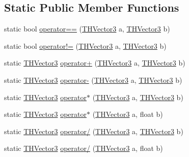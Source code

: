 \subsection*{Static Public Member Functions}
\begin{DoxyCompactItemize}
\item 
static bool \hyperlink{struct_bee_game_1_1_t_h_vector3_a34bd2c518136fe76411bba95f75cebdb}{operator==} (\hyperlink{struct_bee_game_1_1_t_h_vector3}{T\+H\+Vector3} a, \hyperlink{struct_bee_game_1_1_t_h_vector3}{T\+H\+Vector3} b)
\item 
static bool \hyperlink{struct_bee_game_1_1_t_h_vector3_a899f8d05be6344481d7411fee8b933a1}{operator!=} (\hyperlink{struct_bee_game_1_1_t_h_vector3}{T\+H\+Vector3} a, \hyperlink{struct_bee_game_1_1_t_h_vector3}{T\+H\+Vector3} b)
\item 
static \hyperlink{struct_bee_game_1_1_t_h_vector3}{T\+H\+Vector3} \hyperlink{struct_bee_game_1_1_t_h_vector3_a49eda0cb0ef9880dbcc9a60eaede8738}{operator+} (\hyperlink{struct_bee_game_1_1_t_h_vector3}{T\+H\+Vector3} a, \hyperlink{struct_bee_game_1_1_t_h_vector3}{T\+H\+Vector3} b)
\item 
static \hyperlink{struct_bee_game_1_1_t_h_vector3}{T\+H\+Vector3} \hyperlink{struct_bee_game_1_1_t_h_vector3_a036ff2d81d5be5ebbff5fe88555b6c79}{operator-\/} (\hyperlink{struct_bee_game_1_1_t_h_vector3}{T\+H\+Vector3} a, \hyperlink{struct_bee_game_1_1_t_h_vector3}{T\+H\+Vector3} b)
\item 
static \hyperlink{struct_bee_game_1_1_t_h_vector3}{T\+H\+Vector3} \hyperlink{struct_bee_game_1_1_t_h_vector3_a12e036f0743ac6ad26ac3b5c936c2b99}{operator$\ast$} (\hyperlink{struct_bee_game_1_1_t_h_vector3}{T\+H\+Vector3} a, \hyperlink{struct_bee_game_1_1_t_h_vector3}{T\+H\+Vector3} b)
\item 
static \hyperlink{struct_bee_game_1_1_t_h_vector3}{T\+H\+Vector3} \hyperlink{struct_bee_game_1_1_t_h_vector3_a62b6cab97890f7bb66c69c6f60bab04f}{operator$\ast$} (\hyperlink{struct_bee_game_1_1_t_h_vector3}{T\+H\+Vector3} a, float b)
\item 
static \hyperlink{struct_bee_game_1_1_t_h_vector3}{T\+H\+Vector3} \hyperlink{struct_bee_game_1_1_t_h_vector3_a465cd9dbaa1888ead6ea805852847e25}{operator/} (\hyperlink{struct_bee_game_1_1_t_h_vector3}{T\+H\+Vector3} a, \hyperlink{struct_bee_game_1_1_t_h_vector3}{T\+H\+Vector3} b)
\item 
static \hyperlink{struct_bee_game_1_1_t_h_vector3}{T\+H\+Vector3} \hyperlink{struct_bee_game_1_1_t_h_vector3_a20da6def0da94e1266e1b3ee56d2f299}{operator/} (\hyperlink{struct_bee_game_1_1_t_h_vector3}{T\+H\+Vector3} a, float b)
\end{DoxyCompactItemize}
